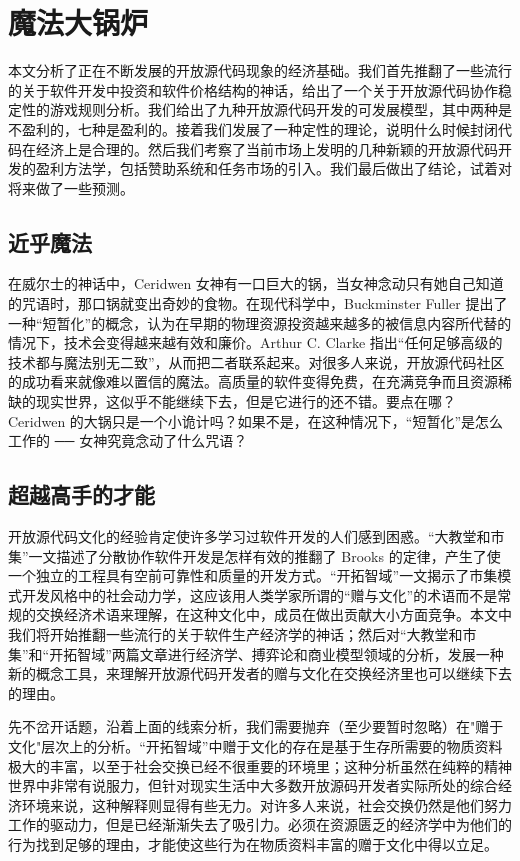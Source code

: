 \section{魔法大锅炉}
本文分析了正在不断发展的开放源代码现象的经济基础。我们首先推翻了一些流行的关于软件开发中投资和软件价格结构的神话，给出了一个关于开放源代码协作稳定性的游戏规则分析。我们给出了九种开放源代码开发的可发展模型，其中两种是不盈利的，七种是盈利的。接着我们发展了一种定性的理论，说明什么时候封闭代码在经济上是合理的。然后我们考察了当前市场上发明的几种新颖的开放源代码开发的盈利方法学，包括赞助系统和任务市场的引入。我们最后做出了结论，试着对将来做了一些预测。

\subsection{近乎魔法}
在威尔士的神话中，Ceridwen 女神有一口巨大的锅，当女神念动只有她自己知道的咒语时，那口锅就变出奇妙的食物。在现代科学中，Buckminster Fuller 提出了一种“短暂化”的概念，认为在早期的物理资源投资越来越多的被信息内容所代替的情况下，技术会变得越来越有效和廉价。Arthur C. Clarke 指出“任何足够高级的技术都与魔法别无二致”，从而把二者联系起来。对很多人来说，开放源代码社区的成功看来就像难以置信的魔法。高质量的软件变得免费，在充满竞争而且资源稀缺的现实世界，这似乎不能继续下去，但是它进行的还不错。要点在哪？Ceridwen 的大锅只是一个小诡计吗？如果不是，在这种情况下，“短暂化”是怎么工作的 ── 女神究竟念动了什么咒语？

\subsection{超越高手的才能}
开放源代码文化的经验肯定使许多学习过软件开发的人们感到困惑。“大教堂和市集”一文描述了分散协作软件开发是怎样有效的推翻了 Brooks 的定律，产生了使一个独立的工程具有空前可靠性和质量的开发方式。“开拓智域”一文揭示了市集模式开发风格中的社会动力学，这应该用人类学家所谓的“赠与文化”的术语而不是常规的交换经济术语来理解，在这种文化中，成员在做出贡献大小方面竞争。本文中我们将开始推翻一些流行的关于软件生产经济学的神话；然后对“大教堂和市集”和“开拓智域”两篇文章进行经济学、搏弈论和商业模型领域的分析，发展一种新的概念工具，来理解开放源代码开发者的赠与文化在交换经济里也可以继续下去的理由。


先不岔开话题，沿着上面的线索分析，我们需要抛弃（至少要暂时忽略）在"赠于文化"层次上的分析。“开拓智域”中赠于文化的存在是基于生存所需要的物质资料极大的丰富，以至于社会交换已经不很重要的环境里；这种分析虽然在纯粹的精神世界中非常有说服力，但针对现实生活中大多数开放源码开发者实际所处的综合经济环境来说，这种解释则显得有些无力。对许多人来说，社会交换仍然是他们努力工作的驱动力，但是已经渐渐失去了吸引力。必须在资源匮乏的经济学中为他们的行为找到足够的理由，才能使这些行为在物质资料丰富的赠于文化中得以立足。


